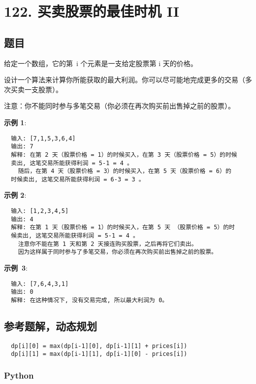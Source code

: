 \newpage
\section{122. 买卖股票的最佳时机 II}
\label{leetcode:122}

\subsection{题目}

给定一个数组，它的第 i 个元素是一支给定股票第 i 天的价格。

设计一个算法来计算你所能获取的最大利润。你可以尽可能地完成更多的交易（多次买卖一支股票）。

注意：你不能同时参与多笔交易（你必须在再次购买前出售掉之前的股票）。

\textbf{示例 1}:

\begin{verbatim}
  输入: [7,1,5,3,6,4]
  输出: 7
  解释: 在第 2 天（股票价格 = 1）的时候买入，在第 3 天（股票价格 = 5）的时候
  卖出, 这笔交易所能获得利润 = 5-1 = 4 。
    随后，在第 4 天（股票价格 = 3）的时候买入，在第 5 天（股票价格 = 6）的
  时候卖出, 这笔交易所能获得利润 = 6-3 = 3 。
\end{verbatim}

\textbf{示例 2}:

\begin{verbatim}
  输入: [1,2,3,4,5]
  输出: 4
  解释: 在第 1 天（股票价格 = 1）的时候买入，在第 5 天 （股票价格 = 5）的时
  候卖出, 这笔交易所能获得利润 = 5-1 = 4 。
    注意你不能在第 1 天和第 2 天接连购买股票，之后再将它们卖出。
    因为这样属于同时参与了多笔交易，你必须在再次购买前出售掉之前的股票。
\end{verbatim}

\textbf{示例 3}:

\begin{verbatim}
  输入: [7,6,4,3,1]
  输出: 0
  解释: 在这种情况下, 没有交易完成, 所以最大利润为 0。
\end{verbatim}

\subsection{参考题解，动态规划}

\begin{verbatim}
  dp[i][0] = max(dp[i-1][0], dp[i-1][1] + prices[i])
  dp[i][1] = max(dp[i-1][1], dp[i-1][0] - prices[i])
\end{verbatim}

\subsubsection{Python}

